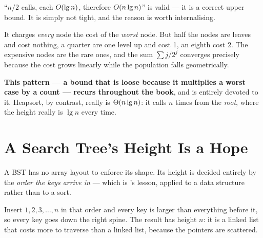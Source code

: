 \begin{conceptbox}
``$n/2$ calls, each $O(\operatorname{lg} n)$, therefore $O(n \operatorname{lg} n)$'' is valid ---
it is a correct upper bound. It is simply not tight, and the reason is worth
internalising.

\smallskip
It charges \emph{every} node the cost of the \emph{worst} node. But half the
nodes are leaves and cost nothing, a quarter are one level up and cost 1, an
eighth cost 2. The expensive nodes are the rare ones, and the sum
$\sum j/2^{j}$ converges precisely because the cost grows linearly while the
population falls geometrically.

\smallskip
\textbf{This pattern --- a bound that is loose because it multiplies a worst
case by a count --- recurs throughout the book}, and  is
entirely devoted to it. Heapsort, by contrast, really is $\Theta(n\operatorname{lg} n)$: it
calls  $n$ times from the \emph{root}, where the height
really is $\lg n$ every time.
\end{conceptbox}

\section{A Search Tree's Height Is a Hope}

\begin{alertbox}
A BST has no array layout to enforce its shape. Its height is decided entirely
by the \emph{order the keys arrive in} --- which is 's lesson,
applied to a data structure rather than to a sort.

\smallskip
Insert $1, 2, 3, \ldots, n$ in that order and every key is larger than
everything before it, so every key goes down the right spine. The result has
height $n$: it is a linked list that costs more to traverse than a linked list,
because the pointers are scattered.
\end{alertbox}

